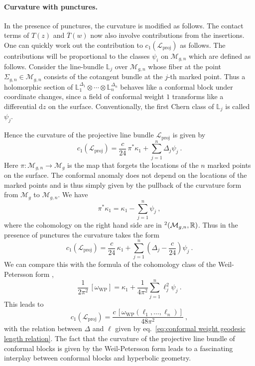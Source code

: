 \documentclass[12pt,a4paper]{article}
\newcommand{\be}{\begin{equation}}
\newcommand{\ee}{\end{equation}}
\renewcommand\d{\text{d}}
\newcommand\RR{\mathbb{R}}
\let\H\relax
\DeclareMathOperator\H{H}
\begin{document}
\paragraph{Curvature with punctures.}
In the presence of punctures, the curvature is modified as follows. The contact terms of $T(z)$ and $\overline{T}(w)$ now also involve contributions from the insertions. One can quickly work out the contribution to $c_1(\mathscr{L}_\text{proj})$ as follows.
The contributions will be proportional to the classes $\psi_i$ on $\mathcal{M}_{g,n}$ which are defined as follows. Consider the line-bundle $\mathbb{L}_j$ over $\mathcal{M}_{g,n}$ whose fiber at the point $\Sigma_{g,n} \in \mathcal{M}_{g,n}$ consists of the cotangent bundle at the $j$-th marked point. Thus a holomorphic section of $\mathbb{L}_1^{\Delta_1} \otimes \cdots \otimes\mathbb{L}_n^{\Delta_n}$ behaves like a conformal block under coordinate changes, since a field of conformal weight $1$ transforms like a differential $\d z$ on the surface. Conventionally, the first Chern class of $\mathbb{L}_j$ is called $\psi_j$.

Hence the curvature of the projective line bundle $\mathscr{L}_\text{proj}$ is given by
\be 
c_1(\mathscr{L}_\text{proj})=\frac{c}{24}\, \pi^*\kappa_1+\sum_{j=1}^n \Delta_j \psi_j\ .
\ee
Here $\pi:\mathcal{M}_{g,n} \longrightarrow \mathcal{M}_g$ is the map that forgets the locations of the $n$ marked points on the surface. The conformal anomaly does not depend on the locations of the marked points and is thus simply given by the pullback of the curvature form from $\mathcal{M}_g$ to $\mathcal{M}_{g,n}$.
We have \cite{Witten:1990hr}
\be 
\pi^* \kappa_1=\kappa_1-\sum_{j=1}^n \psi_j\ ,
\ee
where the cohomology on the right hand side are in $\H^2(\mathcal{M}_{g,n},\RR)$.
Thus in the presence of punctures the curvature takes the form
\be 
c_1(\mathscr{L}_\text{proj})=\frac{c}{24}\, \kappa_1+\sum_{j=1}^n \left(\Delta_j-\frac{c}{24}\right) \psi_j\ .
\ee
We can compare this with the formula of the cohomology class of the Weil-Petersson form \cite{Mirzakhani:2006eta},
\be 
\frac{1}{2\pi^2}\, [\omega_\text{WP}]=\kappa_1+\frac{1}{4\pi^2} \sum_{j=1}^n \ell_j^2 \psi_j\ . \label{eq:first Chern class line bundle kappa psi}
\ee
This leads to 
\be 
c_1(\mathscr{L}_\text{proj})=\frac{c \, [\omega_\text{WP}(\ell_1,\dots,\ell_n)]}{48\pi^2}\ ,
\ee
with the relation between $\Delta$ and $\ell$ given by eq.~\eqref{eq:conformal weight geodesic length relation}.
The fact that the curvature of the projective line bundle of conformal blocks is given by the Weil-Petersson form leads to a fascinating interplay between conformal blocks and hyperbolic geometry.
\end{document}
